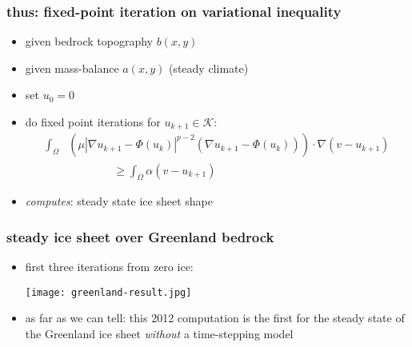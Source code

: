 \documentclass{beamer}
\begin{document}
\begin{frame}
  \frametitle{thus: fixed-point iteration on variational inequality} 

\begin{itemize}
\item given bedrock topography $b(x,y)$
\item given mass-balance $a(x,y)$ (steady climate)
\item set $u_0 = 0$
\item do fixed point iterations for $u_{k+1} \in \mathcal{K}$:
\begin{align*}
\int_{\Omega} &\left( \mu |\nabla u_{k+1} - \Phi(u_k)|^{p-2}
(\nabla u_{k+1} - \Phi(u_k) ) \right) \cdot \nabla (v - u_{k+1}) \\
&\qquad\qquad \ge \int_{\Omega} \alpha (v -  u_{k+1})
\end{align*}

\bigskip
\item \emph{computes}: steady state ice sheet shape
\end{itemize}
\end{frame}


\begin{frame}
  \frametitle{steady ice sheet over Greenland bedrock }

\begin{itemize}
\item first three iterations from zero ice:

\begin{center}
\texttt{[image: greenland-result.jpg]}
\end{center}
\item as far as we can tell: this 2012 computation is the first for the steady state of the Greenland ice sheet \emph{without} a time-stepping model
\end{itemize}
\end{frame}
\end{document}
